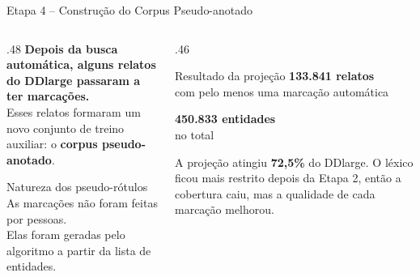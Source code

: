 \documentclass[aspectratio=169, 9pt]{beamer}
\begin{document}
\begin{frame}{Etapa 4 -- Construção do Corpus Pseudo-anotado}
  \begin{columns}[T]
    \begin{column}{.48\textwidth}
      \textbf{Depois da busca automática, alguns relatos do DDlarge passaram a ter marcações.}\\[8pt]

      Esses relatos formaram um novo conjunto de treino auxiliar: o \textbf{corpus pseudo-anotado}.

      \vspace{8pt}
      \begin{exampleblock}{Natureza dos pseudo-rótulos}
        As marcações não foram feitas por pessoas.\\[4pt]
        Elas foram geradas pelo algoritmo a partir da lista de entidades.
      \end{exampleblock}
    \end{column}

    \begin{column}{.46\textwidth}
      \begin{block}{Resultado da projeção}
        \centering
        \Large \textbf{133.841 relatos}\\[4pt]
        \normalsize com pelo menos uma marcação automática

        \vspace{8pt}
        \Large \textbf{450.833 entidades}\\[4pt]
        \normalsize no total
      \end{block}

      \vspace{8pt}
      \small
      A projeção atingiu \textbf{72,5\%} do DDlarge. O léxico ficou mais restrito depois da Etapa 2, então a cobertura caiu, mas a qualidade de cada marcação melhorou.
    \end{column}
  \end{columns}
\end{frame}
\end{document}

